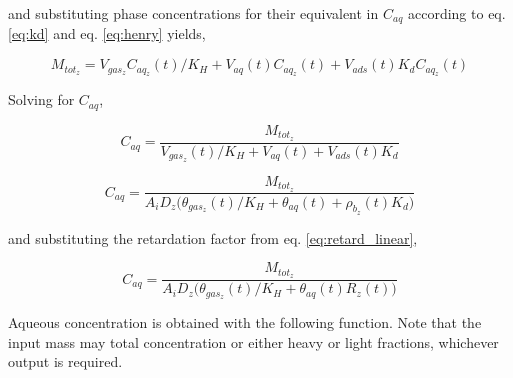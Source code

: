 \documentclass[]{article}
\begin{document}
and substituting phase concentrations for their equivalent in \(C_{aq}\)
according to eq. \ref{eq:kd} and eq. \ref{eq:henry} yields,

\begin{equation}
M_{tot_z} = V_{gas_z}C_{aq_z}(t)/K_H + V_{aq}(t)C_{aq_z}(t) + V_{ads}(t)K_dC_{aq_z}(t)
\label{eq:mass_tot_sub}  
\end{equation}

Solving for \(C_{aq}\),

\begin{equation}
C_{aq} = \frac{M_{tot_z} }{  V_{gas_z}(t)/K_H + V_{aq}(t) + V_{ads}(t)K_d }
\label{eq:mass_tot_conc_aq1}  
\end{equation}

\begin{equation}
C_{aq} = \frac{M_{tot_z} }{ A_iD_z \Big( \theta_{gas_z}(t)/K_H + \theta_{aq}(t) + \rho_{b_z}(t)K_d \Big)}
\label{eq:mass_tot_conc_aq2}  
\end{equation}

and substituting the retardation factor from eq. \ref{eq:retard_linear},

\begin{equation}
C_{aq} = \frac{M_{tot_z} }{ A_iD_z \Big( \theta_{gas_z}(t)/K_H + \theta_{aq}(t)R_z(t) \Big)}
\label{eq:mass_tot_conc_aq2}  
\end{equation}

Aqueous concentration is obtained with the following function. Note that
the input mass may total concentration or either heavy or light
fractions, whichever output is required.
\end{document}
